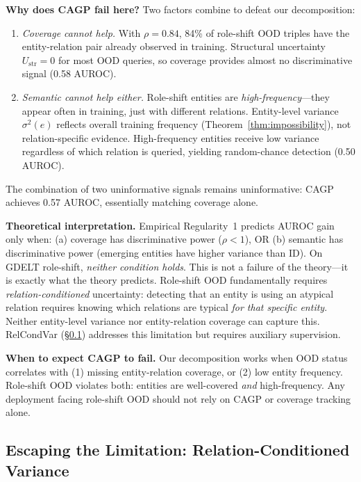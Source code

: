 \textbf{Why does CAGP fail here?} Two factors combine to defeat our decomposition:
\begin{enumerate}
    \item \emph{Coverage cannot help.} With $\rho = 0.84$, 84\% of role-shift OOD triples have the entity-relation pair already observed in training. Structural uncertainty $U_{\text{str}} = 0$ for most OOD queries, so coverage provides almost no discriminative signal (0.58 AUROC).
    \item \emph{Semantic cannot help either.} Role-shift entities are \emph{high-frequency}---they appear often in training, just with different relations. Entity-level variance $\sigma^2(e)$ reflects overall training frequency (Theorem~\ref{thm:impossibility}), not relation-specific evidence. High-frequency entities receive low variance regardless of which relation is queried, yielding random-chance detection (0.50 AUROC).
\end{enumerate}
The combination of two uninformative signals remains uninformative: CAGP achieves 0.57 AUROC, essentially matching coverage alone.

\textbf{Theoretical interpretation.} Empirical Regularity~1 predicts AUROC gain only when: (a) coverage has discriminative power ($\rho < 1$), OR (b) semantic has discriminative power (emerging entities have higher variance than ID). On GDELT role-shift, \emph{neither condition holds}. This is not a failure of the theory---it is exactly what the theory predicts. Role-shift OOD fundamentally requires \emph{relation-conditioned} uncertainty: detecting that an entity is using an atypical relation requires knowing which relations are typical \emph{for that specific entity}. Neither entity-level variance nor entity-relation coverage can capture this. RelCondVar (\S\ref{sec:relcondvar_exp}) addresses this limitation but requires auxiliary supervision.

\textbf{When to expect CAGP to fail.} Our decomposition works when OOD status correlates with (1) missing entity-relation coverage, or (2) low entity frequency. Role-shift OOD violates both: entities are well-covered \emph{and} high-frequency. Any deployment facing role-shift OOD should not rely on CAGP or coverage tracking alone.

\subsection{Escaping the Limitation: Relation-Conditioned Variance}
\label{sec:relcondvar_exp}

